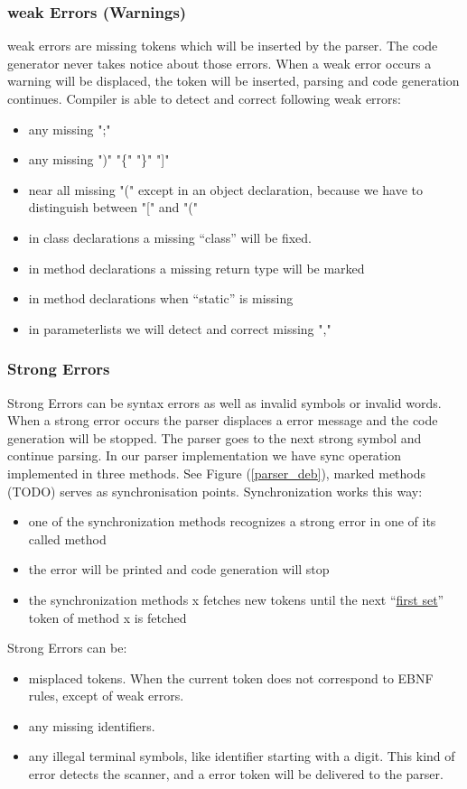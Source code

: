 \subsubsection{weak Errors (Warnings)}
\label{label_weak_errors}
weak errors are missing tokens which will be inserted by the parser.
The code generator never takes notice about those errors. When a weak error occurs a warning will be displaced, the token will be inserted, parsing and code generation continues.
Compiler is able to detect and correct following weak errors:
\begin{itemize}
  \item any missing ";"
  \item any missing ")" "\{" "\}" "]" 
  \item near all missing "(" except in an object declaration, because we have to distinguish between "[" and "(" 
  \item in class declarations a missing ``class'' will be fixed.
  \item in method declarations a missing return type will be marked
  \item in method declarations when ``static'' is missing
  \item in parameterlists we will detect and correct missing ","
\end{itemize}

\subsubsection{Strong Errors}
\label{label_strong_errors}
Strong Errors can be syntax errors as well as invalid symbols or invalid words. When a strong error occurs the parser displaces a error
message and the code generation will be stopped. The parser goes to the next strong symbol and continue parsing. In our parser
implementation we have sync operation implemented in three methods. See Figure (\ref{parser_deb}), marked methods (TODO) serves as
synchronisation points. Synchronization works this way:
\begin{itemize}
  \item one of the synchronization methods recognizes a strong error in one of its called method
  \item the error will be printed and code generation will stop
  \item the synchronization methods x fetches new tokens until the next ``\hyperref[first_sets]{first set}'' token of method x is fetched
\end{itemize}
Strong Errors can be:
\begin{itemize}
  \item misplaced tokens. When the current token does not correspond to EBNF rules, except of weak errors.
  \item any missing identifiers.
  \item any illegal terminal symbols, like identifier starting with a digit. This kind of error detects the scanner, and a
  error token will be delivered to the parser.
\end{itemize}

